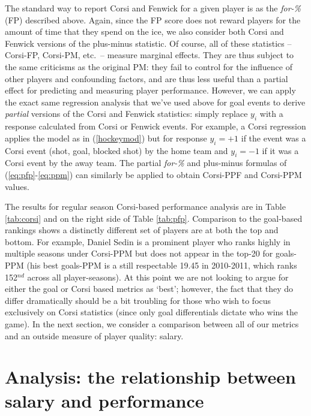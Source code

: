 The standard way to report Corsi and Fenwick for a given player is as the
\textit{for-\%} (FP) described above.  Again, since the FP score does not
reward players for the amount of time that they spend on the ice, we also
consider both Corsi and Fenwick versions of the plus-minus statistic. Of
course, all of these statistics -- Corsi-FP, Corsi-PM, etc.~-- measure
marginal effects.  They are thus subject to the same criticisms as the
original PM: they fail to control for the influence of other players and
confounding factors, and are thus less useful than a partial effect for
predicting and measuring player performance.  However, we can apply the exact
same regression analysis that we've used above for goal events to derive
\textit{partial} versions of the Corsi and Fenwick statistics: simply replace
$y_i$ with a response calculated from Corsi or Fenwick events.  For example, a
Corsi regression applies the model as in (\ref{hockeymod}) but for response
$y_i=+1$ if the event was a Corsi event (shot, goal, blocked shot) by the home
team and $y_i=-1$ if it was a Corsi event by the away team. The partial \textit{for-\%}
and plus-minus formulas of (\ref{eq:pfp}-\ref{eq:ppm}) can similarly be applied to 
obtain Corsi-PPF and Corsi-PPM values.

The results for regular season Corsi-based performance analysis are in Table \ref{tab:corsi}
and on the right side of Table \ref{tab:pfp}.  Comparison to the goal-based
rankings shows a distinctly different set of players are at both the top and
bottom.  For example, Daniel Sedin is a prominent player who ranks highly in
multiple seasons under Corsi-PPM but does not appear in the top-20 for
goals-PPM (his best goals-PPM is a still respectable 19.45 in 2010-2011, which
ranks 152$^{nd}$ across all player-seasons).  At this point we are not looking
to argue for either the goal or Corsi based metrics as `best'; however, the
fact that they do differ dramatically should be a bit troubling for those who
wish to focus exclusively on Corsi statistics (since only goal differentials
dictate who wins the game).  In the next section, we consider a comparison
between all of our metrics and an outside measure of player quality: salary.

\section[Salary and Performance]{Analysis: the relationship between salary and performance}
\label{sec:salary}

